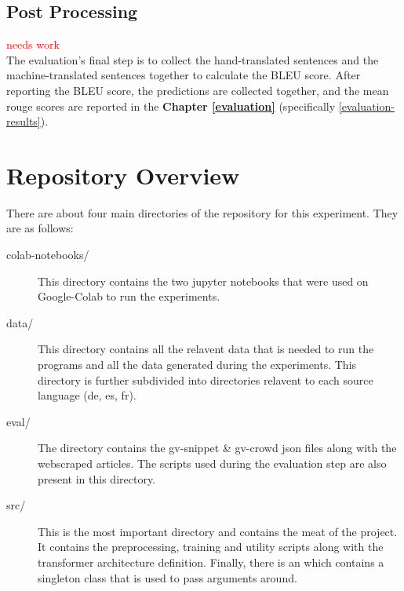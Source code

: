 \documentclass[12pt,a4paper,twoside,openright]{report}
\newcommand{\red}[1]{\textcolor{red}{#1}}
\begin{document}
\subsection{Post Processing}
\label{postprocessing}

\red{needs work}\\
The evaluation's final step is to collect the hand-translated sentences and the machine-translated sentences together to calculate the BLEU score. After reporting the BLEU score, the predictions are collected together, and the mean rouge scores are reported in the \textbf{Chapter \ref{evaluation} } (specifically \ref{evaluation-results}).


\section{Repository Overview}
There are about four main directories of the repository for this experiment. They are as follows:
\begin{description}
    \item[colab-notebooks/] This directory contains the two jupyter notebooks that were used on Google-Colab to run the experiments.
    \item[data/] This directory contains all the relavent data that is needed to run the programs and all the data generated during the experiments. This directory is further subdivided into directories relavent to each source language (de, es, fr).
    \item[eval/] The directory contains the gv-snippet \& gv-crowd json files along with the webscraped articles. The scripts used during the evaluation step are also present in this directory.
    \item[src/] This is the most important directory and contains the meat of the project. It contains the preprocessing, training and utility scripts along with the transformer architecture definition. Finally, there is an  which contains a singleton class that is used to pass arguments around.
\end{description}
\end{document}
